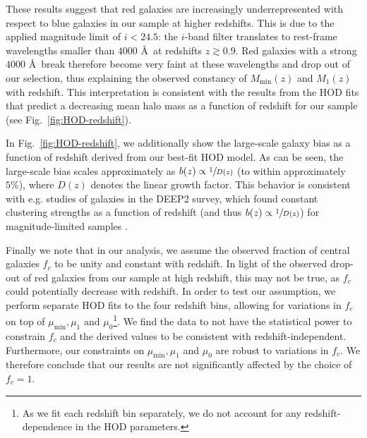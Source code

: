 \documentclass[a4paper,11pt]{article}
\begin{document}
      These results suggest that red galaxies are increasingly underrepresented with respect to blue galaxies in our sample at higher redshifts. This is due to the applied magnitude limit of $i < 24.5$: the $i$-band filter translates to rest-frame wavelengths smaller than $4000$ \AA \, at redshifts $z \gtrsim 0.9$. Red galaxies with a strong $4000$ \AA \, break therefore become very faint at these wavelengths and drop out of our selection, thus explaining the observed constancy of $M_{\mathrm{min}}(z)$ and $M_{1}(z)$ with redshift. This interpretation is consistent with the results from the HOD fits that predict a decreasing mean halo mass as a function of redshift for our sample (see Fig.~\ref{fig:HOD-redshift}).

      In Fig.~\ref{fig:HOD-redshift}, we additionally show the large-scale galaxy bias as a function of redshift derived from our best-fit HOD model. As can be seen, the large-scale bias scales approximately as $b(z) \propto \sfrac{1}{D(z)}$ (to within approximately $5 \%$), where $D(z)$ denotes the linear growth factor. This behavior is consistent with e.g. studies of galaxies in the DEEP2 survey, which found constant clustering strengths as a function of redshift (and thus $b(z) \propto \sfrac{1}{D(z)}$) for magnitude-limited samples \cite{Coil:2004}.
      
Finally we note that in our analysis, we assume the observed fraction of central galaxies $f_{c}$ to be unity and constant with redshift. In light of the observed drop-out of red galaxies from our sample at high redshift, this may not be true, as $f_{c}$ could potentially decrease with redshift. In order to test our assumption, we perform separate HOD fits to the four redshift bins, allowing for variations in $f_{c}$ on top of $\mu_{\mathrm{min}}, \mu_{1}$ and $\mu_{0}$\footnote{As we fit each redshift bin separately, we do not account for any redshift-dependence in the HOD parameters.}. We find the data to not have the statistical power to constrain $f_{c}$ and the derived values to be consistent with redshift-independent. Furthermore, our constraints on $\mu_{\mathrm{min}}, \mu_{1}$ and $\mu_{0}$ are robust to variations in $f_{c}$. We therefore conclude that our results are not significantly affected by the choice of $f_{c}=1$.  
\end{document}
